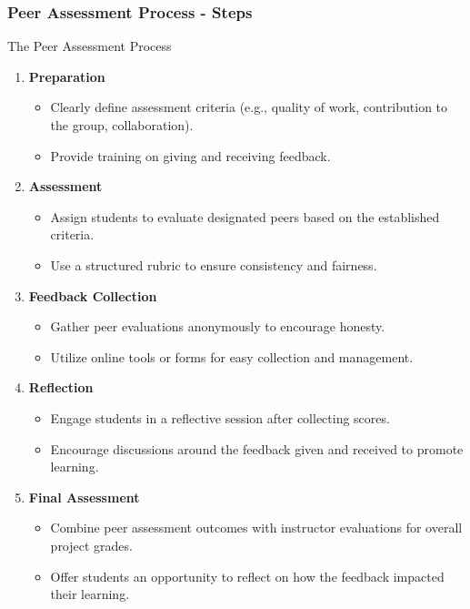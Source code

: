 \documentclass{beamer}
\begin{document}
\begin{frame}[fragile]
    \frametitle{Peer Assessment Process - Steps}
    \begin{block}{The Peer Assessment Process}
        \begin{enumerate}
            \item \textbf{Preparation}
            \begin{itemize}
                \item Clearly define assessment criteria (e.g., quality of work, contribution to the group, collaboration).
                \item Provide training on giving and receiving feedback.
            \end{itemize}
            \item \textbf{Assessment}
            \begin{itemize}
                \item Assign students to evaluate designated peers based on the established criteria.
                \item Use a structured rubric to ensure consistency and fairness.
            \end{itemize}
            \item \textbf{Feedback Collection}
            \begin{itemize}
                \item Gather peer evaluations anonymously to encourage honesty.
                \item Utilize online tools or forms for easy collection and management.
            \end{itemize}
            \item \textbf{Reflection}
            \begin{itemize}
                \item Engage students in a reflective session after collecting scores.
                \item Encourage discussions around the feedback given and received to promote learning.
            \end{itemize}
            \item \textbf{Final Assessment}
            \begin{itemize}
                \item Combine peer assessment outcomes with instructor evaluations for overall project grades.
                \item Offer students an opportunity to reflect on how the feedback impacted their learning.
            \end{itemize}
        \end{enumerate}
    \end{block}
\end{frame}
\end{document}
